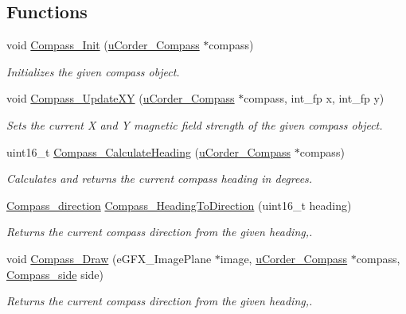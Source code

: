 \subsection*{Functions}
\begin{DoxyCompactItemize}
\item 
void \hyperlink{bicorder-compass_8h_a25d1189ee5127c18accd79eb68019cde}{Compass\+\_\+\+Init} (\hyperlink{structuCorder__Compass}{u\+Corder\+\_\+\+Compass} $\ast$compass)
\begin{DoxyCompactList}\small\item\em Initializes the given compass object. \end{DoxyCompactList}\item 
void \hyperlink{bicorder-compass_8h_a3e79bc358c252d3044f23b7e0766b54f}{Compass\+\_\+\+Update\+XY} (\hyperlink{structuCorder__Compass}{u\+Corder\+\_\+\+Compass} $\ast$compass, int\+\_\+fp x, int\+\_\+fp y)
\begin{DoxyCompactList}\small\item\em Sets the current X and Y magnetic field strength of the given compass object. \end{DoxyCompactList}\item 
uint16\+\_\+t \hyperlink{bicorder-compass_8h_a0fd608a7bf9aea8112efb03a4bc9bc5f}{Compass\+\_\+\+Calculate\+Heading} (\hyperlink{structuCorder__Compass}{u\+Corder\+\_\+\+Compass} $\ast$compass)
\begin{DoxyCompactList}\small\item\em Calculates and returns the current compass heading in degrees. \end{DoxyCompactList}\item 
\hyperlink{bicorder-compass_8h_a642eb4472a57f1a847ee101e3b7af5ba}{Compass\+\_\+direction} \hyperlink{bicorder-compass_8h_a1051f457631ee90b4f082177cf19d469}{Compass\+\_\+\+Heading\+To\+Direction} (uint16\+\_\+t heading)
\begin{DoxyCompactList}\small\item\em Returns the current compass direction from the given heading,. \end{DoxyCompactList}\item 
void \hyperlink{bicorder-compass_8h_a0ae721c1c17301cdf28bd0668a4f90af}{Compass\+\_\+\+Draw} (e\+G\+F\+X\+\_\+\+Image\+Plane $\ast$image, \hyperlink{structuCorder__Compass}{u\+Corder\+\_\+\+Compass} $\ast$compass, \hyperlink{bicorder-compass_8h_a7e36843c53aaafda9795876e659ffe7b}{Compass\+\_\+side} side)
\begin{DoxyCompactList}\small\item\em Returns the current compass direction from the given heading,. \end{DoxyCompactList}\end{DoxyCompactItemize}


